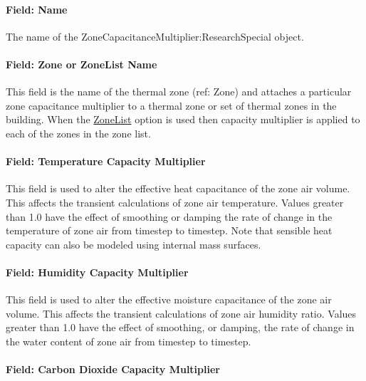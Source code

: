 \paragraph{Field: Name}\label{field-name-hybrid-model}

The name of the ZoneCapacitanceMultiplier:ResearchSpecial object.

\paragraph{Field: Zone or ZoneList Name}\label{field-Zone-or-zonelist-name-hybrid-model}

This field is the name of the thermal zone (ref: Zone) and attaches a particular zone capacitance multiplier to a thermal zone or set of thermal zones in the building. When the \hyperref[zonelist]{ZoneList} option is used then capacity multiplier is applied to each of the zones in the zone list.

\paragraph{Field: Temperature Capacity Multiplier}\label{field-temperature-capacity-multiplier}

This field is used to alter the effective heat capacitance of the zone air volume. This affects the transient calculations of zone air temperature. Values greater than 1.0 have the effect of smoothing or damping the rate of change in the temperature of zone air from timestep to timestep. Note that sensible heat capacity can also be modeled using internal mass surfaces.

\paragraph{Field: Humidity Capacity Multiplier}\label{field-humidity-capacity-multiplier}

This field is used to alter the effective moisture capacitance of the zone air volume. This affects the transient calculations of zone air humidity ratio. Values greater than 1.0 have the effect of smoothing, or damping, the rate of change in the water content of zone air from timestep to timestep.

\paragraph{Field: Carbon Dioxide Capacity Multiplier}\label{field-carbon-dioxide-capacity-multiplier}


